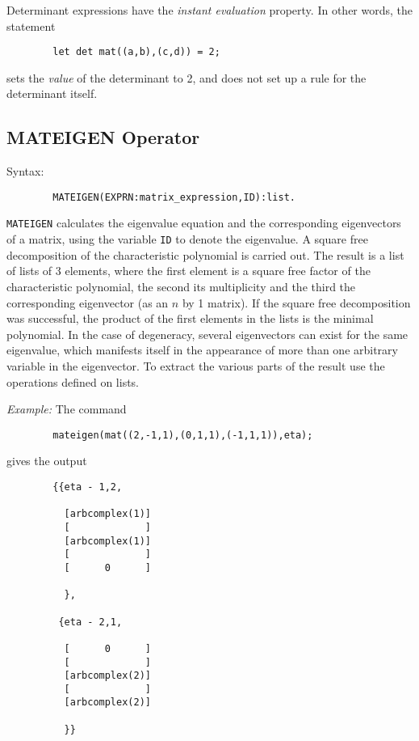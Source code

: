 Determinant expressions have the \emph{instant evaluation} property.
  In other words, the statement
\begin{verbatim}
        let det mat((a,b),(c,d)) = 2;
\end{verbatim}
sets the \emph{value} of the determinant to 2, and does not set up a rule
for the determinant itself.

\subsection{MATEIGEN Operator}
\hypertarget{operator:MATEIGEN}{}
Syntax:
\begin{verbatim}
        MATEIGEN(EXPRN:matrix_expression,ID):list.
\end{verbatim}

\texttt{MATEIGEN} calculates the eigenvalue equation and the corresponding
eigenvectors of a matrix, using the variable \texttt{ID} to denote the
eigenvalue.  A square free decomposition of the characteristic polynomial
is carried out.  The result is a list of lists of 3 elements, where the
first element is a square free factor of the characteristic polynomial,
the second its multiplicity and the third the corresponding eigenvector
(as an $n$ by 1 matrix).  If the square free decomposition was
successful, the product of the first elements in the lists is the minimal
polynomial.  In the case of degeneracy, several eigenvectors can exist for
the same eigenvalue, which manifests itself in the appearance of more than
one arbitrary variable in the eigenvector.  To extract the various parts
of the result use the operations defined on lists.

\textit{Example:}
 The command
\begin{verbatim}
        mateigen(mat((2,-1,1),(0,1,1),(-1,1,1)),eta);
\end{verbatim}
gives the output
\begin{verbatim}
        {{eta - 1,2,

          [arbcomplex(1)]
          [             ]
          [arbcomplex(1)]
          [             ]
          [      0      ]

          },

         {eta - 2,1,

          [      0      ]
          [             ]
          [arbcomplex(2)]
          [             ]
          [arbcomplex(2)]

          }}
\end{verbatim}

